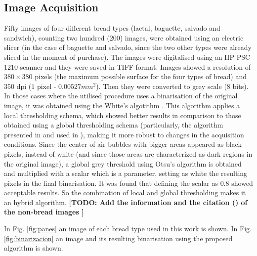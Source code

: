 \documentclass[oneside,a4paper,english,links]{amca}
\newcommand{\todo}[1]{\textbf{[TODO: #1]}}
\begin{document}
\subsection{Image Acquisition}
Fifty images of four different bread types (lactal, baguette, salvado and sandwich), counting two hundred ($200$) images, were obtained using an electric slicer (in the case of baguette and salvado, since the two other types were already sliced in the moment of purchase). The images were digitalised using an HP PSC 1210 scanner and they were saved in TIFF format. Images showed a resolution of $380 \times 380$ pixels (the maximum possible surface for the four types of bread) and $350$ dpi ($1$ pixel - $0.00527 mm^{2}$). Then they were converted to grey scale ($8$ bits). In those cases where the utilised procedure uses a binarisation of the original image, it was obtained using the White's algotithm \cite{White83}. This algorithm applies a local thresholding schema, which showed better results in comparison to those obtained using a global thresholding schema (particularly, the algorithm presented in \cite{Huang95} and used in \cite{Gonzales2008}), making it more robust to changes in the acquisition conditions. Since the center of air bubbles with bigger areas appeared as black pixels, instead of white (and since those areas are characterized as dark regions in the original image), a global grey threshold using Otsu's algorithm \cite{Otsu79} is obtained and multiplied with a scalar which is a parameter, setting as white the resulting pixels in the final binarisation. It was found that defining the scalar as $0.8$ showed acceptable results. So the combination of local and global thresholding makes it an hybrid algorithm.
\todo{Add the information and the citation (\cite{FeiFei04}) of the non-bread images }

In Fig. \ref{fig:panes} an image of each bread type used in this work is shown. In Fig. \ref{fig:binarizacion} an image and its resulting binarisation using the proposed algorithm is shown.
\end{document}
